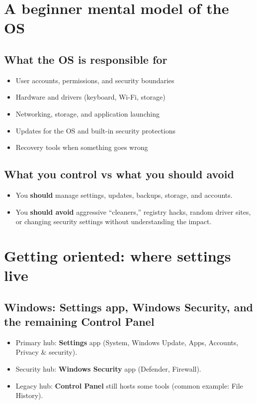 \section{A beginner mental model of the OS}
\subsection{What the OS is responsible for}
\begin{itemize}
\item User accounts, permissions, and security boundaries
\item Hardware and drivers (keyboard, Wi-Fi, storage)
\item Networking, storage, and application launching
\item Updates for the OS and built-in security protections
\item Recovery tools when something goes wrong
\end{itemize}

\subsection{What you control vs what you should avoid}
\begin{itemize}
\item You \textbf{should} manage settings, updates, backups, storage, and accounts.
\item You \textbf{should avoid} aggressive “cleaners,” registry hacks, random driver sites, or changing security settings without understanding the impact.
\end{itemize}

\section{Getting oriented: where settings live}
\subsection{Windows: Settings app, Windows Security, and the remaining Control Panel}
\begin{itemize}
\item Primary hub: \textbf{Settings} app (System, Windows Update, Apps, Accounts, Privacy \& security).
\item Security hub: \textbf{Windows Security} app (Defender, Firewall).
\item Legacy hub: \textbf{Control Panel} still hosts some tools (common example: File History).
\end{itemize}

